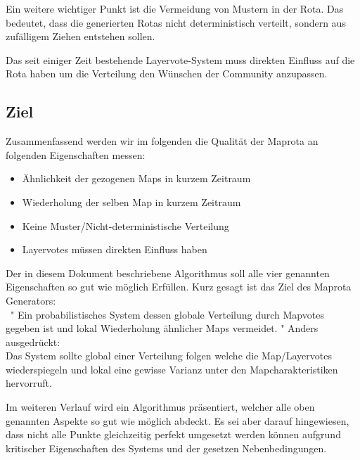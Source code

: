             Ein weitere wichtiger Punkt ist die Vermeidung von Mustern in der Rota. 
            Das bedeutet, dass die generierten Rotas nicht deterministisch verteilt, sondern aus zufälligem Ziehen entstehen sollen.
            
            Das seit einiger Zeit bestehende Layervote-System muss direkten Einfluss auf die Rota haben um die Verteilung den Wünschen der Community anzupassen.

        \subsection{Ziel}
            Zusammenfassend werden wir im folgenden die Qualität der Maprota an folgenden Eigenschaften messen:
            \begin{itemize}
                \item Ähnlichkeit der gezogenen Maps in kurzem Zeitraum
                \item Wiederholung der selben Map in kurzem Zeitraum
                \item Keine Muster/Nicht-deterministische Verteilung 
                \item Layervotes müssen direkten Einfluss haben 
            \end{itemize}

            Der in diesem Dokument beschriebene Algorithmus soll alle vier genannten Eigenschaften so gut wie möglich Erfüllen.
            Kurz gesagt ist das Ziel des Maprota Generators:\\\
            " Ein probabilistisches System dessen globale Verteilung durch Mapvotes gegeben ist und lokal Wiederholung ähnlicher Maps vermeidet. "
            Anders ausgedrückt:\\
            Das System sollte global einer Verteilung folgen welche die Map/Layervotes wiederspiegeln und lokal eine gewisse Varianz unter den Mapcharakteristiken hervorruft.

            Im weiteren Verlauf wird ein Algorithmus präsentiert, welcher alle oben genannten Aspekte so gut wie möglich abdeckt. 
            Es sei aber darauf hingewiesen, dass nicht alle Punkte gleichzeitig perfekt umgesetzt werden können aufgrund kritischer Eigenschaften des Systems und der gesetzen Nebenbedingungen.
